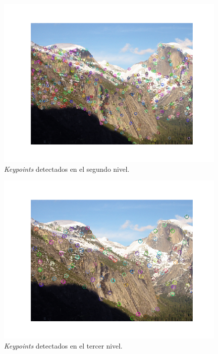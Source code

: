 \documentclass[11pt,a4paper]{article}
\begin{document}
\begin{figure}[H]
	\centering
	\includegraphics[scale=0.6]{img/scale1}
	\caption{\textit{Keypoints} detectados en el segundo nivel.}
	\label{fig:scale1}
\end{figure}

\begin{figure}[H]
	\centering
	\includegraphics[scale=0.6]{img/scale2}
	\caption{\textit{Keypoints} detectados en el tercer nivel.}
	\label{fig:scale2}
\end{figure}
\end{document}
